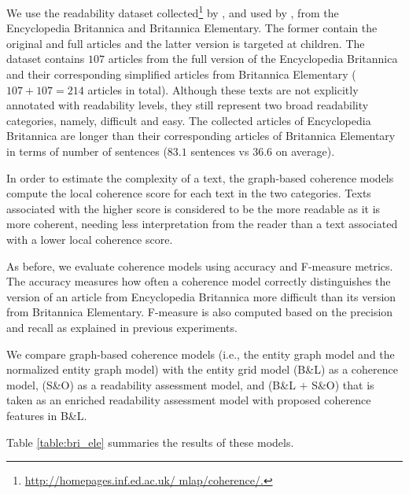 We use the readability dataset collected\footnote{\url{http://homepages.inf.ed.ac.uk/ mlap/coherence/.}} by , and used by , from the Encyclopedia Britannica and Britannica Elementary. 
The former contain the original and full articles and the latter version is targeted at children. 
The dataset contains $107$ articles from the full version of the Encyclopedia Britannica and their corresponding simplified articles from Britannica Elementary ($107 + 107 = 214$ articles in total).
Although these texts are not explicitly annotated with readability levels, they still represent two broad readability categories, namely, difficult and easy. 
The collected articles of Encyclopedia Britannica are longer than their corresponding articles of Britannica Elementary in terms of number of sentences ($83.1$ sentences vs $36.6$ on average). 


In order to estimate the complexity of a text, the graph-based coherence models compute the local coherence score for each text in the two categories.  
Texts associated with the higher score is considered to be the more readable as it is more coherent, needing less interpretation from the reader than a text associated with a lower local coherence score. 


As before, we evaluate coherence models using accuracy and F-measure metrics. 
The accuracy measures how often a coherence model correctly distinguishes the version of an article from Encyclopedia Britannica more difficult than its version from Britannica Elementary. 
F-measure is also computed based on the precision and recall as explained in previous experiments. 

We compare graph-based coherence models (i.e., the entity graph model and the normalized entity graph model) with the entity grid model (B\&L) as a coherence model, (S\&O) as a readability assessment model, and (B\&L $+$ S\&O) that is taken as an enriched readability assessment model with proposed coherence features in B\&L. 


Table \ref{table:bri_ele} summaries the results of these models. 

